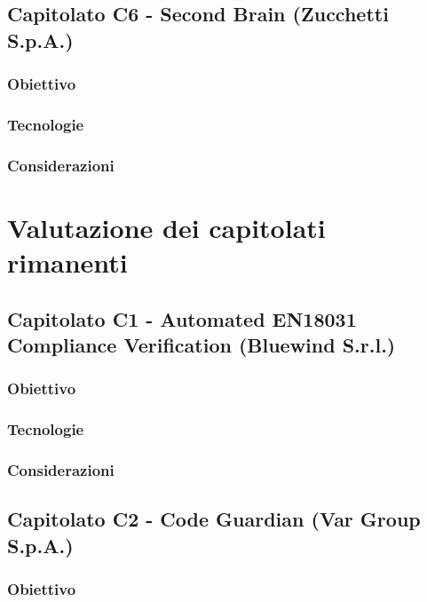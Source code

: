 \documentclass[a4paper, 10pt, colorlinks=true, linkcolor=black, urlcolor=blue, citecolor=blue, hidelinks]{article}
\begin{document}
\subsection{Capitolato C6 - Second Brain (Zucchetti S.p.A.)}

\subsubsection{Obiettivo}

\subsubsection{Tecnologie}

\subsubsection{Considerazioni}

\section{Valutazione dei capitolati rimanenti}

\subsection{Capitolato C1 - Automated EN18031 Compliance Verification (Bluewind S.r.l.)}

\subsubsection{Obiettivo}

\subsubsection{Tecnologie}

\subsubsection{Considerazioni}

\subsection{Capitolato C2 - Code Guardian (Var Group S.p.A.)}

\subsubsection{Obiettivo}
\end{document}
